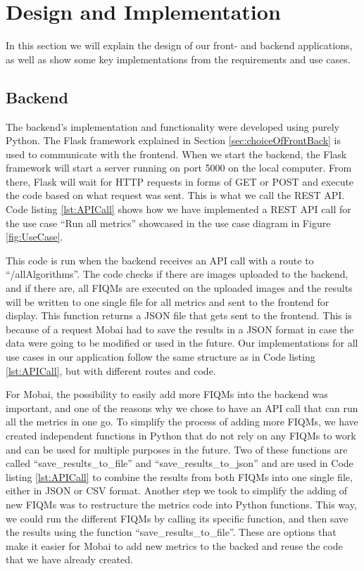 \section{Design and Implementation}
\label{sec:designAndImplamentation}
In this section we will explain the design of our front- and backend applications, as well as show some key implementations from the requirements and use cases.  

\subsection{Backend}
The backend's implementation and functionality were developed using purely Python. The Flask framework explained in Section \ref{sec:choiceOfFrontBack} is used to communicate with the frontend. When we start the backend, the Flask framework will start a server running on port 5000 on the local computer. From there, Flask will wait for HTTP requests in forms of GET or POST and execute the code based on what request was sent. This is what we call the REST API. Code listing \ref{lst:APICall} shows how we have implemented a REST API call for the use case ``Run all metrics'' showcased in the use case diagram in Figure \ref{fig:UseCase}. 

 

This code is run when the backend receives an API call with a route to ``/allAlgorithms''. The code checks if there are images uploaded to the backend, and if there are, all FIQMs are executed on the uploaded images and the results will be written to one single file for all metrics and sent to the frontend for display. This function returns a JSON file that gets sent to the frontend. This is because of a request Mobai had to save the results in a JSON format in case the data were going to be modified or used in the future. Our implementations for all use cases in our application follow the same structure as in Code listing \ref{lst:APICall}, but with different routes and code. 

For Mobai, the possibility to easily add more FIQMs into the backend was important, and one of the reasons why we chose to have an API call that can run all the metrics in one go. To simplify the process of adding more FIQMs, we have created independent functions in Python that do not rely on any FIQMs to work and can be used for multiple purposes in the future. Two of these functions are called ``save\_results\_to\_file'' and ``save\_results\_to\_json'' and are used in Code listing \ref{lst:APICall} to combine the results from both FIQMs into one single file, either in JSON or CSV format. Another step we took to simplify the adding of new FIQMs was to restructure the metrics code into Python functions. This way, we could run the different FIQMs by calling its specific function, and then save the results using the function ``save\_results\_to\_file''. These are options that make it easier for Mobai to add new metrics to the backed and reuse the code that we have already created. 

